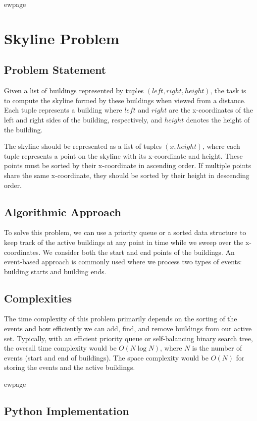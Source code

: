 
ewpage
\chapter{Skyline Problem}
\label{chap:skyline_problem}

\section*{Problem Statement}
Given a list of buildings represented by tuples \((left, right, height)\), the task is to compute the skyline formed by these buildings when viewed from a distance. Each tuple represents a building where \(left\) and \(right\) are the x-coordinates of the left and right sides of the building, respectively, and \(height\) denotes the height of the building. 

The skyline should be represented as a list of tuples \((x, height)\), where each tuple represents a point on the skyline with its x-coordinate and height. These points must be sorted by their x-coordinate in ascending order. If multiple points share the same x-coordinate, they should be sorted by their height in descending order. 

\section*{Algorithmic Approach}
To solve this problem, we can use a priority queue or a sorted data structure to keep track of the active buildings at any point in time while we sweep over the x-coordinates. We consider both the start and end points of the buildings. An event-based approach is commonly used where we process two types of events: building starts and building ends.

\section*{Complexities}
The time complexity of this problem primarily depends on the sorting of the events and how efficiently we can add, find, and remove buildings from our active set. Typically, with an efficient priority queue or self-balancing binary search tree, the overall time complexity would be \(O(N \log N)\), where \(N\) is the number of events (start and end of buildings). The space complexity would be \(O(N)\) for storing the events and the active buildings.

ewpage

\section*{Python Implementation}

